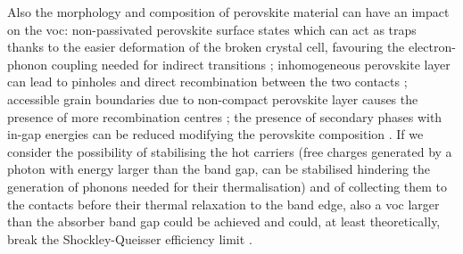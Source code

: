 	Also the morphology and composition of perovskite material can have an impact on the \gls{voc}: non-passivated perovskite surface states which can act as traps \cite{Zheng2017} thanks to the easier deformation of the broken crystal cell, favouring the electron-phonon coupling needed for indirect transitions \cite{Wu2015}; inhomogeneous perovskite layer can lead to pinholes and direct recombination between the two contacts \cite{Lee2015,Montcada2017,Qiu2016,Marchioro2014}; accessible grain boundaries due to non-compact perovskite layer causes the presence of more recombination centres \cite{Shao2016a}; the presence of secondary phases with in-gap energies can be reduced modifying the perovskite composition \cite{Bi2016}.
	If we consider the possibility of stabilising the hot carriers (free charges generated by a photon with energy larger than the band gap, can be stabilised hindering the generation of phonons needed for their thermalisation) and of collecting them to the contacts before their thermal relaxation to the band edge, also a \gls{voc} larger than the absorber band gap could be achieved and could, at least theoretically, break the Shockley\hyp{}Queisser efficiency limit \cite{WikipediaSQlimit}.
	


